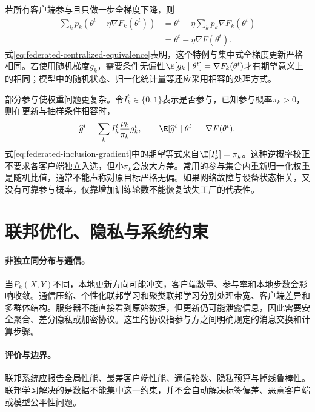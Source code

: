 若所有客户端参与且只做一步全梯度下降，则
\begin{align}
 \sum_kp_k(\theta^t-\eta\nabla F_k(\theta^t))
 &=\theta^t-\eta\sum_kp_k\nabla F_k(\theta^t)\\
 &=\theta^t-\eta\nabla F(\theta^t).\label{eq:federated-centralized-equivalence}
\end{align}
式\eqref{eq:federated-centralized-equivalence}表明，这个特例与集中式全梯度更新严格相同。若使用随机梯度$g_k$，需要条件无偏性$\E[g_k\mid\theta^t]=\nabla F_k(\theta^t)$才有期望意义上的相同；模型中的随机状态、归一化统计量等还应采用相容的处理方式。

部分参与使权重问题更复杂。令$I_k^t\in\{0,1\}$表示是否参与，已知参与概率$\pi_k>0$，则在更新与抽样条件相容时，
\begin{equation}
 \widehat g^t=\sum_k I_k^t\frac{p_k}{\pi_k}g_k^t,
 \qquad \E[\widehat g^t\mid\theta^t]=\nabla F(\theta^t).\label{eq:federated-inclusion-gradient}
\end{equation}
式\eqref{eq:federated-inclusion-gradient}中的期望等式来自$\E[I_k^t]=\pi_k$。这种逆概率校正不要求各客户端独立入选，但小$\pi_k$会放大方差。常用的参与集合内重新归一化权重是随机比值，通常不能声称对原目标严格无偏。如果网络故障与设备状态相关，又没有可靠参与概率，仅靠增加训练轮数不能恢复缺失工厂的代表性。

\section{联邦优化、隐私与系统约束}
\paragraph{非独立同分布与通信。}
当$P_k(X,Y)$不同，本地更新方向可能冲突，客户端数量、参与率和本地步数会影响收敛。通信压缩、个性化联邦学习和聚类联邦学习分别处理带宽、客户端差异和多群体结构。服务器不能直接看到原始数据，但更新仍可能泄露信息，因此需要安全聚合、差分隐私或加密协议。这里的协议指参与方之间明确规定的消息交换和计算步骤。

\paragraph{评价与边界。}
联邦系统应报告全局性能、最差客户端性能、通信轮数、隐私预算与掉线鲁棒性。联邦学习解决的是数据不能集中这一约束，并不会自动解决标签偏差、恶意客户端或模型公平性问题。

